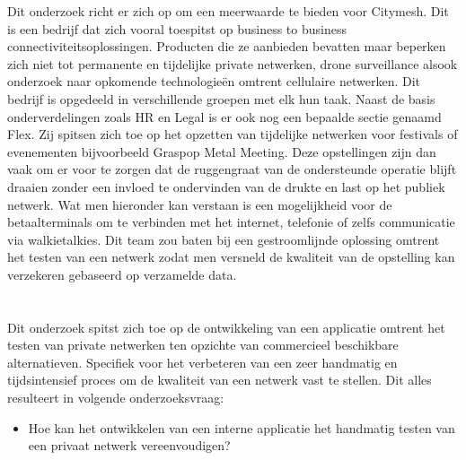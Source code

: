 Dit onderzoek richt er zich op om een meerwaarde te bieden voor Citymesh. Dit is een bedrijf dat zich vooral toespitst op business to business connectiviteitsoplossingen. Producten die ze aanbieden bevatten maar beperken zich niet tot permanente en tijdelijke private netwerken, drone surveillance alsook onderzoek naar opkomende technologieën omtrent cellulaire netwerken. Dit bedrijf is opgedeeld in verschillende groepen met elk hun taak. Naast de basis onderverdelingen zoals HR en Legal is er ook nog een bepaalde sectie genaamd Flex. Zij spitsen zich toe op het opzetten van tijdelijke netwerken voor festivals of evenementen bijvoorbeeld Graspop Metal Meeting. Deze opstellingen zijn dan vaak om er voor te zorgen dat de ruggengraat van de ondersteunde operatie blijft draaien zonder een invloed te ondervinden van de drukte en last op het publiek netwerk. Wat men hieronder kan verstaan is een mogelijkheid voor de betaalterminals om te verbinden met het internet, telefonie of zelfs communicatie via walkietalkies. Dit team zou baten bij een gestroomlijnde oplossing omtrent het testen van een netwerk zodat men versneld de kwaliteit van de opstelling kan verzekeren gebaseerd op verzamelde data.

\section{}%
\label{sec:onderzoeksvraag}


Dit onderzoek spitst zich toe op de ontwikkeling van een applicatie omtrent het testen van private netwerken ten opzichte van commercieel beschikbare alternatieven. Specifiek voor het verbeteren van een zeer handmatig en tijdsintensief proces om de kwaliteit van een netwerk vast te stellen. Dit alles resulteert in volgende onderzoeksvraag:
\begin{itemize}
    \item Hoe kan het ontwikkelen van een interne applicatie het handmatig testen van een privaat netwerk vereenvoudigen?
\end{itemize}

